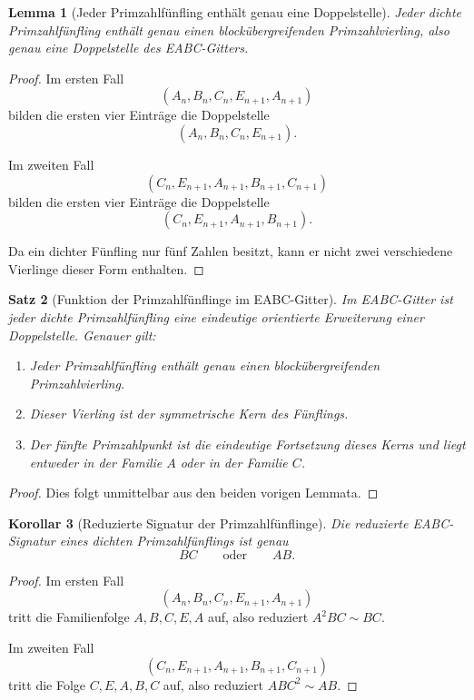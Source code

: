 \documentclass[11pt,a4paper]{article}
\newtheorem{satz}{Satz}
\newtheorem{lemma}[satz]{Lemma}
\newtheorem{korollar}[satz]{Korollar}
\theoremstyle{definition}
\theoremstyle{remark}
\begin{document}
	\begin{lemma}[Jeder Primzahlfünfling enthält genau eine Doppelstelle]
		Jeder dichte Primzahlfünfling enthält genau einen blockübergreifenden Primzahlvierling, also
		genau eine Doppelstelle des EABC-Gitters.
	\end{lemma}
	
	\begin{proof}
		Im ersten Fall
		\[
		(A_n,B_n,C_n,E_{n+1},A_{n+1})
		\]
		bilden die ersten vier Einträge die Doppelstelle
		\[
		(A_n,B_n,C_n,E_{n+1}).
		\]
		
		Im zweiten Fall
		\[
		(C_n,E_{n+1},A_{n+1},B_{n+1},C_{n+1})
		\]
		bilden die ersten vier Einträge die Doppelstelle
		\[
		(C_n,E_{n+1},A_{n+1},B_{n+1}).
		\]
		
		Da ein dichter Fünfling nur fünf Zahlen besitzt, kann er nicht zwei verschiedene Vierlinge dieser
		Form enthalten.
	\end{proof}
	
	\begin{satz}[Funktion der Primzahlfünflinge im EABC-Gitter]
		Im EABC-Gitter ist jeder dichte Primzahlfünfling eine eindeutige orientierte Erweiterung einer
		Doppelstelle. Genauer gilt:
		
		\begin{enumerate}[label=\textup{(\roman*)}]
			\item Jeder Primzahlfünfling enthält genau einen blockübergreifenden Primzahlvierling.
			\item Dieser Vierling ist der symmetrische Kern des Fünflings.
			\item Der fünfte Primzahlpunkt ist die eindeutige Fortsetzung dieses Kerns und liegt entweder in
			der Familie \(A\) oder in der Familie \(C\).
		\end{enumerate}
	\end{satz}
	
	\begin{proof}
		Dies folgt unmittelbar aus den beiden vorigen Lemmata.
	\end{proof}
	
	\begin{korollar}[Reduzierte Signatur der Primzahlfünflinge]
		Die reduzierte EABC-Signatur eines dichten Primzahlfünflings ist genau
		\[
		BC
		\qquad\text{oder}\qquad
		AB.
		\]
	\end{korollar}
	
	\begin{proof}
		Im ersten Fall
		\[
		(A_n,B_n,C_n,E_{n+1},A_{n+1})
		\]
		tritt die Familienfolge \(A,B,C,E,A\) auf, also reduziert \(A^2BC\sim BC\).
		
		Im zweiten Fall
		\[
		(C_n,E_{n+1},A_{n+1},B_{n+1},C_{n+1})
		\]
		tritt die Folge \(C,E,A,B,C\) auf, also reduziert \(ABC^2\sim AB\).
	\end{proof}
	
\end{document}
